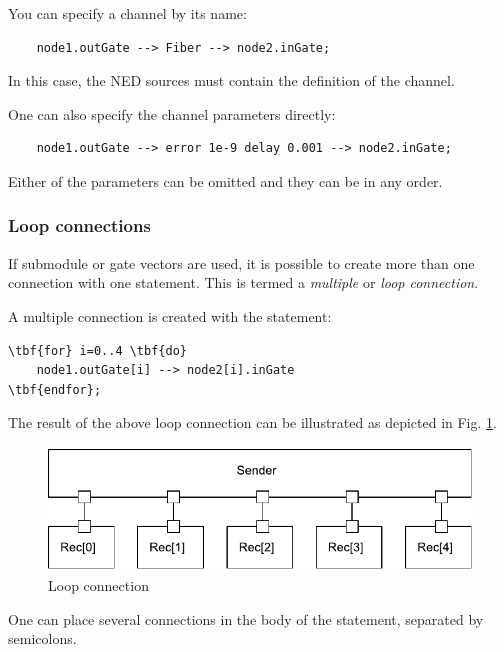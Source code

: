 You can specify a channel by its name:
\begin{verbatim}
    node1.outGate --> Fiber --> node2.inGate;
\end{verbatim}

In this case, the NED sources must contain the definition of
the channel.

One can also specify the channel parameters directly:
\begin{verbatim}
    node1.outGate --> error 1e-9 delay 0.001 --> node2.inGate;
\end{verbatim}

Either of the parameters can be omitted and they can be in any
order.


\subsubsection{Loop connections}


If submodule or gate vectors are used, it is possible to create
more than one connection with one statement. This is termed a \textit{multiple}
or \textit{loop connection}.

A multiple connection is created with the 
statement:

\begin{Verbatim}[commandchars=\\\{\}]
\tbf{for} i=0..4 \tbf{do}
    node1.outGate[i] --> node2[i].inGate
\tbf{endfor};
\end{Verbatim}


The result of the above loop connection can be illustrated as
depicted in Fig. \ref{fig:ch-ned-lang:loop-connection}.

\begin{figure}[htbp]
\begin{center}
\includegraphics[width=4.625in, height=1.297in]{figures/usmanFig7}
\caption{Loop connection}
\label{fig:ch-ned-lang:loop-connection}
\end{center}
\end{figure}


One can place several connections in the body of the
 statement, separated by semicolons.

